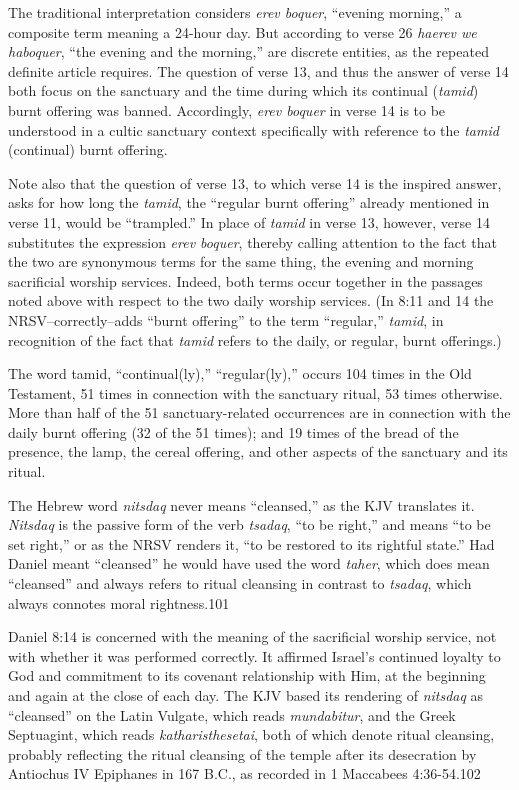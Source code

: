 The traditional interpretation considers \textit{erev boquer}, ``evening morning,'' a
composite term meaning a 24-hour day. But according to verse 26 \textit{haerev we
haboquer}, ``the evening and the morning,'' are discrete entities, as the
repeated definite article requires. The question of verse 13, and thus the
answer of verse 14 both focus on the sanctuary and the time during which its
continual (\textit{tamid}) burnt offering was banned. Accordingly, \textit{erev boquer} in
verse 14 is to be understood in a cultic sanctuary context specifically with
reference to the \textit{tamid} (continual) burnt offering.

Note also that the question of verse 13, to which verse 14 is the inspired
answer, asks for how long the \textit{tamid}, the ``regular burnt offering'' already
mentioned in verse 11, would be ``trampled.'' In place of \textit{tamid} in verse 13, 
however, verse 14 substitutes the expression \textit{erev boquer}, thereby calling
attention to the fact that the two are synonymous terms for the same thing,
the evening and morning sacrificial worship services. Indeed, both terms
occur together in the passages noted above with respect to the two daily
worship services. (In 8:11 and 14 the NRSV--correctly--adds
``burnt offering'' to the term ``regular,'' \textit{tamid}, in recognition of the fact
that \textit{tamid} refers to the daily, or regular, burnt offerings.)

The word tamid, ``continual(ly),'' ``regular(ly),'' occurs 104 times in the Old
Testament, 51 times in connection with the sanctuary ritual, 53 times
otherwise. More than half of the 51 sanctuary-related occurrences are in
connection with the daily burnt offering (32 of the 51 times); and 19 times
of the bread of the presence, the lamp, the cereal offering, and other
aspects of the sanctuary and its ritual. 

The Hebrew word \textit{nitsdaq} never means ``cleansed,'' as the KJV translates it.
\textit{Nitsdaq} is the passive form of the verb \textit{tsadaq}, ``to be right,'' and means ``to
be set right,'' or as the NRSV renders it, ``to be restored to its rightful
state.'' Had Daniel meant ``cleansed'' he would have used the word \textit{taher}, which
does mean ``cleansed'' and always refers to ritual cleansing in contrast to
\textit{tsadaq}, which always connotes moral rightness.101 

Daniel 8:14 is concerned with the meaning of the sacrificial worship
service, not with whether it was performed correctly. It affirmed Israel's
continued loyalty to God and commitment to its covenant relationship with
Him, at the beginning and again at the close of each day. The KJV based its
rendering of \textit{nitsdaq} as ``cleansed'' on the Latin Vulgate, which reads
\textit{mundabitur}, and the Greek Septuagint, which reads \textit{katharisthesetai}, both of
which denote ritual cleansing, probably reflecting the ritual cleansing of
the temple after its desecration by Antiochus IV Epiphanes in 167 B.C., as
recorded in 1 Maccabees 4:36-54.102


